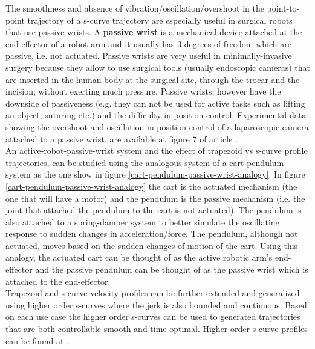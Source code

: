 The smoothness and absence of vibration/oscillation/overshoot in the point-to-point trajectory of a s-curve trajectory are especially useful in surgical robots that use passive wrists. A \textbf{passive wrist} is a mechanical 
device attached at the end-effector of a robot arm and it usually has 3 degrees of freedom which are passive, i.e. not actuated. Passive wrists are very useful in minimally-invasive surgery because they allow to use surgical 
tools (usually endoscopic cameras) that are inserted in the human body at the surgical site, through the trocar and the incision, without exerting much pressure. Passive wrists, however have the downside of passiveness 
(e.g. they can not be used for active tasks such as lifting an object, suturing etc.) and the difficulty in position control. Experimental data showing the overshoot and oscillation in position control of a
laparoscopic camera attached to a passive wrist, are available at figure 7 of article \cite{Bauzano2009ControlMF}.\\

An active-robot-passive-wrist system and the effect of trapezoid vs s-curve profile trajectories, can be studied using the analogous system of a cart-pendulum system as the one show in figure \ref{cart-pendulum-passive-wrist-analogy}. 
In figure \ref{cart-pendulum-passive-wrist-analogy} the cart is the actuated mechanism (the one that will have a motor) and the pendulum is the passive mechanism (i.e. the joint that attached the pendulum to the cart 
is not actuated). The pendulum is also attached to a spring-damper system to better simulate the oscillating response to sudden changes in acceleration/force. The pendulum, although not actuated, moves based on the sudden 
changes of motion of the cart. Using this analogy, the actuated cart can be thought of as the active robotic arm's end-effector and the passive pendulum can be thought of as the passive wrist which is attached to the 
end-effector.\\

Trapezoid and s-curve velocity profiles can be further extended and generalized using higher order s-curves where the jerk is also bounded and continuous. Based on each use case the higher order s-curves can be used to 
generated trajectories that are both controllable smooth and time-optimal. Higher order s-curve profiles can be found at \cite{Nguyen2008HigherOrderSCurves}.
